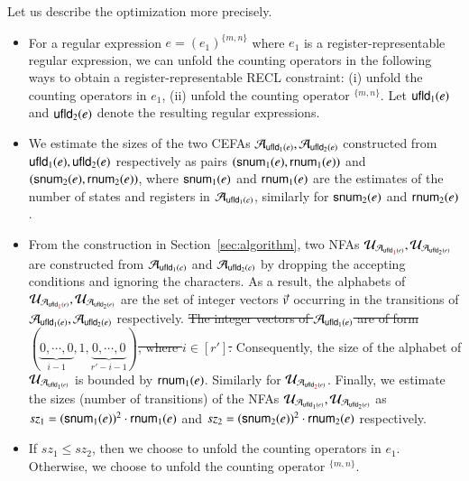 Let us describe the optimization more precisely. 
\begin{itemize}
\item For a regular expression $e = (e_1)^{\{m,n\}}$ where $e_1$ is a register-representable regular expression, we can unfold the counting operators in the following ways to obtain a register-representable RECL constraint: (i) unfold the counting operators in $e_1$, (ii) unfold the counting operator $^{\{m,n\}}$. 
%
Let ${\sf ufld}_1(e)$ and ${\sf ufld}_2(e)$ denote the resulting regular expressions. 

\item We estimate the sizes of the two CEFAs $\mathcal{A}_{{\sf ufld}_1(e)}, \mathcal{A}_{{\sf ufld}_2(e)}$ constructed from ${\sf ufld}_1(e), {\sf ufld}_2(e)$ respectively as pairs $({\sf snum}_1(e), {\sf rnum}_1(e))$ and $({\sf snum}_2(e), {\sf rnum}_2(e))$, where ${\sf snum}_1(e)$ and ${\sf rnum}_1(e)$ are the estimates of the number of states and registers in $\mathcal{A}_{{\sf ufld}_1(e)}$, similarly for ${\sf snum}_2(e)$ and ${\sf rnum}_2(e)$. 
%
\item From the construction in Section~\ref{sec:algorithm}, 
two NFAs $\mathcal{U}_{\mathcal{A}_{{\sf ufld}_{\color{red} 1\color{black}}(e)}}, \mathcal{U}_{\mathcal{A}_{{\sf ufld}_2(e)}}$ are constructed from $\mathcal{A}_{{\sf ufld}_1(e)}$ and $\mathcal{A}_{{\sf ufld}_2(e)}$ by dropping the accepting conditions and ignoring the characters. As a result, the alphabets of $\mathcal{U}_{\mathcal{A}_{{\sf ufld}_{\color{red} 1\color{black}}(e)}}, \mathcal{U}_{\mathcal{A}_{{\sf ufld}_2(e)}}$ are the set of integer vectors \sout{$\vec{v}$} occurring in the transitions of $\mathcal{A}_{{\sf ufld}_1(e)}, \mathcal{A}_{{\sf ufld}_2(e)}$ respectively. \sout{The integer vectors of  $\mathcal{A}_{{\sf ufld}_1(e)}$ are of form $(\underbrace{0, \cdots, 0}_{i-1}, 1, \underbrace{0, \cdots, 0}_{r'-i-1})$, where $i \in [r']$.}  Consequently, the size of the alphabet of $\mathcal{U}_{\mathcal{A}_{{\sf ufld}_1(e)}}$ is bounded by ${\sf rnum}_1(e)$. Similarly for $\mathcal{U}_{\mathcal{A}_{{\sf ufld}_{\color{red} 2\color{black}}(e)}}$. 
Finally, we estimate the sizes (number of transitions) of the NFAs $\mathcal{U}_{\mathcal{A}_{{\sf ufld}_1(e)}}, \mathcal{U}_{\mathcal{A}_{{\sf ufld}_2(e)}}$ as $sz_1 = ({\sf snum}_1(e))^2 \cdot {\sf rnum}_1(e)$ and $sz_2 = ({\sf snum}_2(e))^2 \cdot {\sf rnum}_2(e)$ respectively.
%
\item If $sz_1 \le sz_2$, then we choose to unfold the counting operators in $e_1$. Otherwise, we choose to unfold the counting operator $^{\{m,n\}}$. 
\end{itemize}


